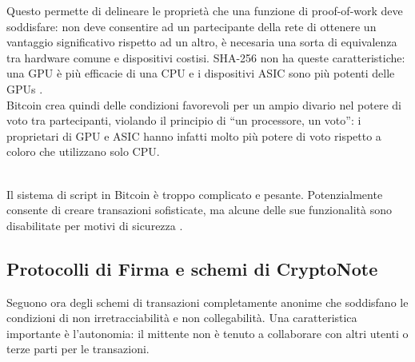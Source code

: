 Questo permette di delineare le proprietà che una funzione di
proof-of-work deve soddisfare: non deve consentire ad un partecipante
della rete di ottenere un vantaggio significativo rispetto ad un altro,
è necesaria una sorta di equivalenza tra hardware comune e dispositivi
costisi. SHA-256 non ha queste caratteristiche: una GPU è più efficacie
di una CPU e i dispositivi ASIC sono più potenti delle GPUs
\cite{mining_hardware}.\\
Bitcoin crea quindi delle condizioni favorevoli per un ampio divario nel
potere di voto tra partecipanti, violando il principio di ``un
processore, un voto'': i proprietari di GPU e ASIC hanno infatti molto
più potere di voto rispetto a coloro che utilizzano solo CPU.\\
\strut \\
Il sistema di script in Bitcoin è troppo complicato e pesante.
Potenzialmente consente di creare transazioni sofisticate, ma alcune
delle sue funzionalità sono disabilitate per motivi di
sicurezza\cite{contracts} \cite{script}.

\subsection{Protocolli di Firma e schemi di
CryptoNote}\label{protocolli-di-firma-e-schemi-di-cryptonote}

Seguono ora degli schemi di transazioni completamente anonime che
soddisfano le condizioni di non irretracciabilità e non collegabilità.
Una caratteristica importante è l'autonomia: il mittente non è tenuto a
collaborare con altri utenti o terze parti per le transazioni.

